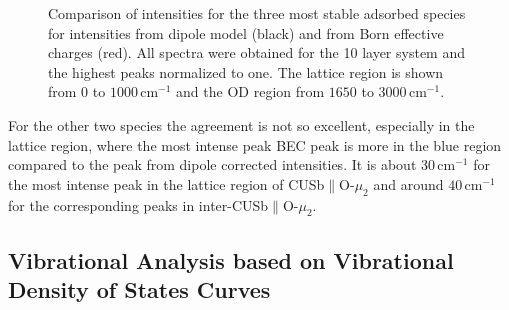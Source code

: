 \documentclass[11pt,DIV=13,BCOR=5mm,a4paper,headinclude]{scrbook}
\begin{document}
\begin{figure}[!h]
             \quad
             \caption{Comparison of intensities for the three most stable adsorbed species for intensities from dipole model (black) and from Born effective charges (red).
             All spectra were obtained for the 10 layer system and the highest peaks normalized to one.
             The lattice region is shown from $0$ to $1000\,$cm$^{-1}$ and the OD region from $1650$ to $3000\,$cm$^{-1}$.
             }
            \label{abb:bec-dip-comp}
\end{figure}
For the other two species the agreement is not so excellent, especially in the lattice region, where the most intense peak BEC peak is more in the blue region compared to the peak from dipole corrected intensities.
It is about $30\,$cm$^{-1}$ for the most intense peak in the lattice region of CUSb$\parallel$O-$\mu_2$ and around $40\,$cm$^{-1}$ for the corresponding peaks in inter-CUSb$\parallel$O-$\mu_2$.


\clearpage
\subsection{Vibrational Analysis based on Vibrational Density of States Curves}\label{vvacf}
\end{document}
